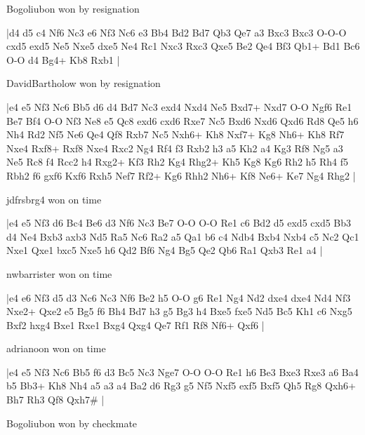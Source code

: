 \showboard

Bogoliubon won by resignation

\makegametitle
|d4 d5 c4 Nf6 Nc3 e6 Nf3 Nc6 e3 Bb4 Bd2 Bd7 Qb3 Qe7 a3 Bxc3 Bxc3 O-O-O cxd5 exd5 Ne5 Nxe5 dxe5 Ne4 Rc1 Nxc3 Rxc3 Qxe5 Be2 Qe4 Bf3 Qb1+ Bd1 Bc6 O-O d4 Bg4+ Kb8 Rxb1  |

\showboard

DavidBartholow won by resignation

\makegametitle
|e4 e5 Nf3 Nc6 Bb5 d6 d4 Bd7 Nc3 exd4 Nxd4 Ne5 Bxd7+ Nxd7 O-O Ngf6 Re1 Be7 Bf4 O-O Nf3 Ne8 e5 Qc8 exd6 cxd6 Rxe7 Nc5 Bxd6 Nxd6 Qxd6 Rd8 Qe5 h6 Nh4 Rd2 Nf5 Ne6 Qe4 Qf8 Rxb7 Nc5 Nxh6+ Kh8 Nxf7+ Kg8 Nh6+ Kh8 Rf7 Nxe4 Rxf8+ Rxf8 Nxe4 Rxc2 Ng4 Rf4 f3 Rxb2 h3 a5 Kh2 a4 Kg3 Rf8 Ng5 a3 Ne5 Rc8 f4 Rcc2 h4 Rxg2+ Kf3 Rh2 Kg4 Rhg2+ Kh5 Kg8 Kg6 Rh2 h5 Rh4 f5 Rbh2 f6 gxf6 Kxf6 Rxh5 Nef7 Rf2+ Kg6 Rhh2 Nh6+ Kf8 Ne6+ Ke7 Ng4 Rhg2  |

\showboard

jdfrsbrg4 won on time

\makegametitle
|e4 e5 Nf3 d6 Bc4 Be6 d3 Nf6 Nc3 Be7 O-O O-O Re1 c6 Bd2 d5 exd5 cxd5 Bb3 d4 Ne4 Bxb3 axb3 Nd5 Ra5 Nc6 Ra2 a5 Qa1 b6 c4 Ndb4 Bxb4 Nxb4 c5 Nc2 Qc1 Nxe1 Qxe1 bxc5 Nxe5 h6 Qd2 Bf6 Ng4 Bg5 Qe2 Qb6 Ra1 Qxb3 Re1 a4  |

\showboard

nwbarrister won on time

\makegametitle
|e4 e6 Nf3 d5 d3 Nc6 Nc3 Nf6 Be2 h5 O-O g6 Re1 Ng4 Nd2 dxe4 dxe4 Nd4 Nf3 Nxe2+ Qxe2 e5 Bg5 f6 Bh4 Bd7 h3 g5 Bg3 h4 Bxe5 fxe5 Nd5 Bc5 Kh1 c6 Nxg5 Bxf2 hxg4 Bxe1 Rxe1 Bxg4 Qxg4 Qe7 Rf1 Rf8 Nf6+ Qxf6  |

\showboard

adrianoon won on time

\makegametitle
|e4 e5 Nf3 Nc6 Bb5 f6 d3 Bc5 Nc3 Nge7 O-O O-O Re1 h6 Be3 Bxe3 Rxe3 a6 Ba4 b5 Bb3+ Kh8 Nh4 a5 a3 a4 Ba2 d6 Rg3 g5 Nf5 Nxf5 exf5 Bxf5 Qh5 Rg8 Qxh6+ Bh7 Rh3 Qf8 Qxh7\#  |

\showboard

Bogoliubon won by checkmate

